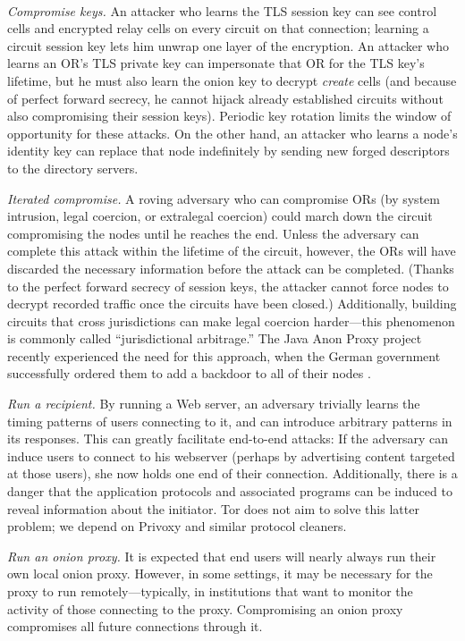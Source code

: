 \documentclass[times,10pt,twocolumn]{article}
\begin{document}
\\
\emph{Compromise keys.} An attacker who learns the TLS session key can
see control cells and encrypted relay cells on every circuit on that
connection; learning a circuit
session key lets him unwrap one layer of the encryption. An attacker
who learns an OR's TLS private key can impersonate that OR for the TLS
key's lifetime, but he must
also learn the onion key to decrypt \emph{create} cells (and because of
perfect forward secrecy, he cannot hijack already established circuits
without also compromising their session keys). Periodic key rotation
limits the window of opportunity for these attacks. On the other hand,
an attacker who learns a node's identity key can replace that node
indefinitely by sending new forged descriptors to the directory servers.

\emph{Iterated compromise.} A roving adversary who can
compromise ORs (by system intrusion, legal coercion, or extralegal
coercion) could march down the circuit compromising the
nodes until he reaches the end.  Unless the adversary can complete
this attack within the lifetime of the circuit, however, the ORs
will have discarded the necessary information before the attack can
be completed.  (Thanks to the perfect forward secrecy of session
keys, the attacker cannot force nodes to decrypt recorded
traffic once the circuits have been closed.)  Additionally, building
circuits that cross jurisdictions can make legal coercion
harder---this phenomenon is commonly called ``jurisdictional
arbitrage.'' The Java Anon Proxy project recently experienced the
need for this approach, when
the German government successfully ordered them to add a backdoor to
all of their nodes \cite{jap-backdoor}.

\emph{Run a recipient.} By running a Web server, an adversary
trivially learns the timing patterns of users connecting to it, and
can introduce arbitrary patterns in its responses.  This can greatly
facilitate end-to-end attacks: If the adversary can induce
users to connect to his webserver (perhaps by advertising
content targeted at those users), she now holds one end of their
connection.  Additionally, there is a danger that the application
protocols and associated programs can be induced to reveal
information about the initiator. Tor does not aim to solve this latter problem;
we depend on Privoxy and similar protocol cleaners.
  
\emph{Run an onion proxy.} It is expected that end users will
nearly always run their own local onion proxy. However, in some
settings, it may be necessary for the proxy to run
remotely---typically, in institutions that want
to monitor the activity of those connecting to the proxy.
Compromising an onion proxy compromises all future connections
through it.
\end{document}
